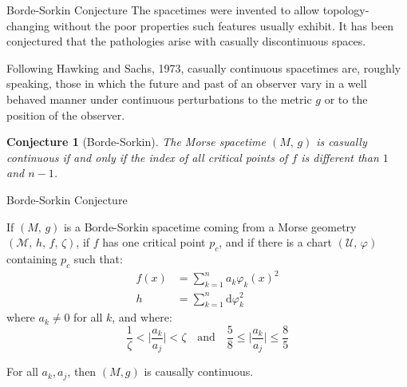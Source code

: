 \documentclass{beamer}
\newtheorem{conjecture}{Conjecture}
\begin{document}
    \begin{frame}{Borde-Sorkin Conjecture}
        The spacetimes were invented to allow topology-changing
        without the poor properties such features usually exhibit. It has been
        conjectured that the pathologies arise with casually discontinuous
        spaces.
        \par\hfill\par
        Following Hawking and Sachs, 1973, casually continuous spacetimes are,
        roughly speaking, those in which the future and past of an observer
        vary in a well behaved manner under continuous perturbations to the
        metric $g$ or to the position of the observer.
        \par\hfill\par
        \begin{conjecture}[Borde-Sorkin]
            The Morse spacetime $(M,\,g)$ is casually continuous if and only
            if the index of all critical points of $f$ is different than
            $1$ and $n-1$.
        \end{conjecture}
    \end{frame}
    \begin{frame}{Borde-Sorkin Conjecture}
        \begin{theorem}
            If $(M,\,g)$ is a Borde-Sorkin spacetime coming from a Morse
            geometry $(\mathcal{M},\,h,\,f,\,\zeta)$, if $f$ has one critical
            point $p_{c}$, and if there is a chart $(\mathcal{U},\,\varphi)$
            containing $p_{c}$ such that:
            \begin{align}
                f(x)&=\sum_{k=1}^{n}a_{k}\varphi_{k}(x)^{2}\\
                h&=\sum_{k=1}^{n}\textrm{d}\varphi_{k}^{2}
            \end{align}
            where $a_{k}\ne{0}$ for all $k$, and where:
            \begin{equation}
                \frac{1}{\zeta}<\Big|\frac{a_{k}}{a_{j}}\Big|<\zeta
                \quad\textrm{and}\quad
                \frac{5}{8}\leq\Big|\frac{a_{k}}{a_{j}}\Big|\leq\frac{8}{5}
            \end{equation}
        \end{theorem}
        For all $a_{k},a_{j}$, then $(M,g)$ is causally continuous.
    \end{frame}
\end{document}
